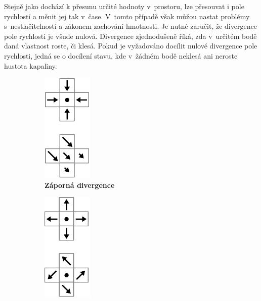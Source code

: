 Stejně jako dochází k přesunu určité hodnoty v~prostoru, lze přesouvat i pole rychlostí a měnit jej tak v~čase. V~tomto případě však můžou nastat problémy s~nestlačitelností a zákonem zachování hmotnosti. Je nutné zaručit, že divergence pole rychlosti je všude nulová. Divergence zjednodušeně říká, zda v~určitém bodě daná vlastnost roste, či klesá. Pokud je vyžadováno docílit nulové divergence pole rychlosti, jedná se o docílení stavu, kde v~žádném bodě neklesá ani neroste hustota kapaliny. \cite{webglFluid}

\begin{figure}[h]
	\centering
	\begin{subfigure}{.3\textwidth}
		\centering
		\includegraphics[width=0.35\linewidth]{obrazky-figures/div-negative.png}
		\caption{\textbf{Záporná divergence}}
		\label{fig:divPlus}
	\end{subfigure}%
	\begin{subfigure}{.3\textwidth}
		\centering
		\includegraphics[width=0.35\linewidth]{obrazky-figures/div-positive.png}

\end{subfigure}
\end{figure}
